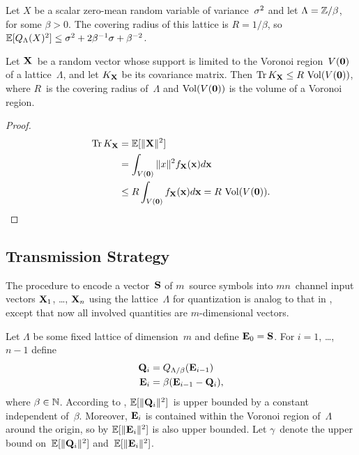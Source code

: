 \begin{example}
  Let $X$ be a scalar zero-mean random variable of variance~$\sq$ and let
  $\Lambda = \Z / \beta$, for some $\beta > 0$. The covering radius of this
  lattice is $R = 1/\beta$, so $\E[\QL(X)^2] \le \sq + 2 \beta^{-1} \sigma +
  \beta^{-2}$.
\end{example}

\begin{lemma}
  \label{lem:voronoivarbound}
  Let $\X$~be a random vector whose support is limited to the Voronoi
  region~$V(\vz)$ of a lattice~$\Lambda$, and let $K_{\X}$ be its covariance
  matrix. Then $\Tr K_{\X} \le R\,\Vol(V(\vz))$, where $R$~is the covering
  radius of~$\Lambda$ and $\Vol(V(\vz))$ is the volume of a Voronoi region.
\end{lemma}

\begin{proof}
  \begin{align*}
    \Tr K_{\X} &= \E[\|\X\|^2] \\
    & = \int_{V(\vz)} \|x\|^2 \fXv(\x) d\x \\
    & \le R \int_{V(\vz)} \fXv(\x) d\x = R\, \Vol(V(\vz)).
  \end{align*}
\end{proof}




\subsection{Transmission Strategy}

The procedure to encode a vector~$\S$ of $m$~source symbols into $mn$~channel
input vectors $\X_1$, \ldots, $\X_n$ using the lattice~$\Lambda$ for
quantization is analog to that in , except that now all
involved quantities are $m$-dimensional vectors.

Let $\Lambda$ be some fixed lattice of dimension~$m$ and define $\Evc_0 = \S$.
For $i = 1$, \ldots, $n-1$ define
\begin{align}
  \Q_i &= \QLb(\Evc_{i-1})  \nonumber \\
  \Evc_i &= \beta ( \Evc_{i-1} - \Q_i), \label{eq:latticeQE}
\end{align}
where $\beta \in \NN$. According to , $\E[\|\Q_i\|^2]$~is
upper bounded by a constant independent of~$\beta$. Moreover, $\Evc_i$
is contained within the Voronoi region of~$\Lambda$ around the origin, so by
 $\E[\|\Evc_i\|^2]$ is also upper bounded. Let
$\gamma$~denote the upper bound on~$\E[\|\Q_i\|^2]$ and~$\E[\|\Evc_i\|^2]$.

